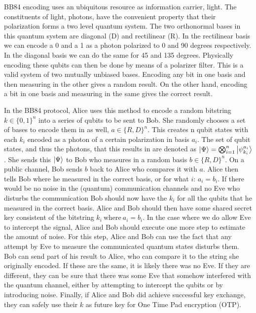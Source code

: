 \documentclass[]{article}
\begin{document}
BB84 encoding uses an ubiquitous resource as information carrier, light. The constituents of light, photons, have the convenient property that their polarization forms a two level quantum system. The two orthonormal bases in this quantum system are diagonal (D) and rectilinear (R). In the rectilinear basis we can encode a 0 and a 1 as a photon polarized to 0 and 90 degrees respectively. In the diagonal basis we can do the same for 45 and 135 degrees. Physically encoding these qubits can then be done by means of a polarizer filter. This is a valid system of two mutually unbiased bases. Encoding any bit in one basis and then measuring in the other gives a random result. On the other hand, encoding a bit in one basis and measuring in the same gives the correct result. 

In the BB84 protocol, Alice uses this method to encode a random bitstring $k \in \{0,1\}^n $ into a series of qubits to be sent to Bob. She randomly chooses a set of bases to encode them in as well,  $a \in \{R, D\}^n$. This creates n qubit states with each $k_i$ encoded as a photon of a certain polarization in basis $a_i$. The set of qubit states, and thus the photons, that this results in are denoted as $\ket{\Psi} = \bigotimes_{i=1}^n \ket{\psi_{k_i}^{a_i}} $. She sends this $\ket{\Psi}$ to Bob who measures in a random basis $b \in \{R, D\}^n$. On a public channel, Bob sends $b$ back to Alice who compares it with $a$. Alice then tells Bob where he measured in the correct basis, or for what $i$: $a_i = b_i$. If there would be no noise in the (quantum) communication channels and no Eve who disturbs the communication Bob should now have the $k_i$ for all the qubits that he measured in the correct basis. Alice and Bob should then have some shared secret key consistent of the bitstring $k_i ~\text{where} ~a_i = b_i$. In the case where we do allow Eve to intercept the signal, Alice and Bob should execute one more step to estimate the amount of noise. For this step, Alice and Bob can use the fact that any attempt by Eve to measure the communicated quantum states disturbs them. Bob can send part of his result to Alice, who can compare it to the string she originally encoded. If these are the same, it is likely there was no Eve. If they are different, they can be sure that there was some Eve that somehow interfered with the quantum channel, either by attempting to intercept the qubits or by introducing noise. Finally, if Alice and Bob did achieve successful key exchange, they can safely use their $k$ as future key for One Time Pad encryption (OTP).
\end{document}
